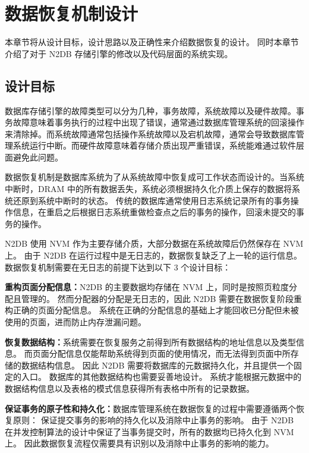 
\chapter{数据恢复机制设计}
\label{chap:recovery}

本章节将从设计目标，设计思路以及正确性来介绍数据恢复的设计。
同时本章节介绍了对于 N2DB 存储引擎的修改以及代码层面的系统实现。

\section{设计目标}


数据库存储引擎的故障类型可以分为几种，事务故障，系统故障以及硬件故障。事务故障意味着事务执行的过程中出现了错误，通常通过数据库管理系统的回滚操作来清除掉。而系统故障通常包括操作系统故障以及宕机故障，通常会导致数据库管理系统运行中断。而硬件故障意味着存储介质出现严重错误，系统能难通过软件层面避免此问题。

数据恢复机制是数据库系统为了从系统故障中恢复成可工作状态而设计的。当系统中断时，DRAM 中的所有数据丢失，系统必须根据持久化介质上保存的数据将系统还原到系统中断时的状态。
传统的数据库通常使用日志系统记录所有的事务操作信息，在重启之后根据日志系统重做检查点之后的事务的操作，回滚未提交的事务的操作。

N2DB 使用 NVM 作为主要存储介质，大部分数据在系统故障后仍然保存在 NVM 上。
由于 N2DB 在运行过程中是无日志的，数据恢复缺乏了上一轮的运行信息。
数据恢复机制需要在无日志的前提下达到以下 3 个设计目标：

\textbf{重构页面分配信息：}N2DB 的主要数据均存储在 NVM 上，同时是按照页粒度分配且管理的。
然而分配器的分配是无日志的，因此 N2DB 需要在数据恢复阶段重构正确的页面分配信息。
系统在正确的分配信息的基础上才能回收已分配但未被使用的页面，进而防止内存泄漏问题。

\textbf{恢复数据结构：}系统需要在恢复服务之前得到所有数据结构的地址信息以及类型信息。
而页面分配信息仅能帮助系统得到页面的使用情况，而无法得到页面中所存储的数据结构信息。
因此 N2DB 需要将数据库的元数据持久化，并且提供一个固定的入口。
数据库的其他数据结构也需要妥善地设计。
系统才能根据元数据中的数据结构信息以及表格的模式信息获得所有表格中所有的记录数据。

\textbf{保证事务的原子性和持久化：}数据库管理系统在数据恢复的过程中需要遵循两个恢复原则：
保证提交事务的影响的持久化以及消除中止事务的影响。
由于 N2DB 在并发控制算法的设计中保证了当事务提交时，所有的数据均已持久化到 NVM 上。
因此数据恢复流程仅需要具有识别以及消除中止事务的影响的能力。

